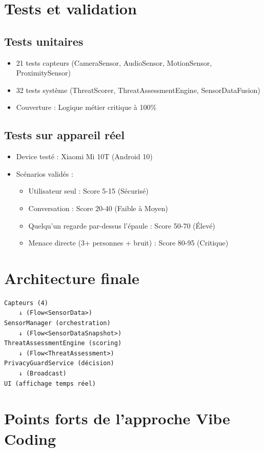 \documentclass[11pt,a4paper]{article}
\begin{document}
\section{Tests et validation}

\subsection{Tests unitaires}
\begin{itemize}
    \item 21 tests capteurs (CameraSensor, AudioSensor, MotionSensor, ProximitySensor)
    \item 32 tests système (ThreatScorer, ThreatAssessmentEngine, SensorDataFusion)
    \item Couverture : Logique métier critique à 100\%
\end{itemize}

\subsection{Tests sur appareil réel}
\begin{itemize}
    \item Device testé : Xiaomi Mi 10T (Android 10)
    \item Scénarios validés :
    \begin{itemize}
        \item Utilisateur seul : Score 5-15 (Sécurisé)
        \item Conversation : Score 20-40 (Faible à Moyen)
        \item Quelqu'un regarde par-dessus l'épaule : Score 50-70 (Élevé)
        \item Menace directe (3+ personnes + bruit) : Score 80-95 (Critique)
    \end{itemize}
\end{itemize}

\section{Architecture finale}

\begin{verbatim}
Capteurs (4)
    ↓ (Flow<SensorData>)
SensorManager (orchestration)
    ↓ (Flow<SensorDataSnapshot>)
ThreatAssessmentEngine (scoring)
    ↓ (Flow<ThreatAssessment>)
PrivacyGuardService (décision)
    ↓ (Broadcast)
UI (affichage temps réel)
\end{verbatim}

\section{Points forts de l'approche Vibe Coding}
\end{document}
